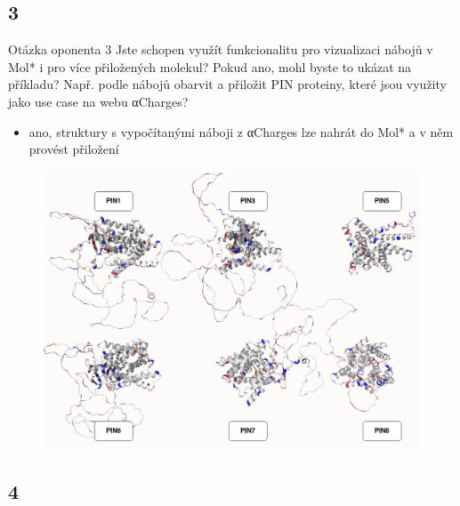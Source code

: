 \documentclass[
]{beamer}
\begin{document}
\subsection[3]{3}

\begin{frame}
  \begin{block}{Otázka oponenta 3}
    Jste schopen využít funkcionalitu pro vizualizaci nábojů v Mol* i pro více přiložených molekul? Pokud ano, mohl byste to ukázat na příkladu? Např. podle nábojů obarvit a přiložit PIN proteiny, které jsou využity jako use case na webu αCharges?
  \end{block}
  \begin{itemize}
    \item ano, struktury s vypočítanými náboji z αCharges lze nahrát do Mol* a v něm provést přiložení
  \end{itemize}
\end{frame}

\begin{frame}{}
  \begin{figure}
    \includegraphics[width=1\textwidth,height=\textheight,keepaspectratio]{images/pins2.png}
  \end{figure}
\end{frame}

\subsection[4]{4}
\end{document}

